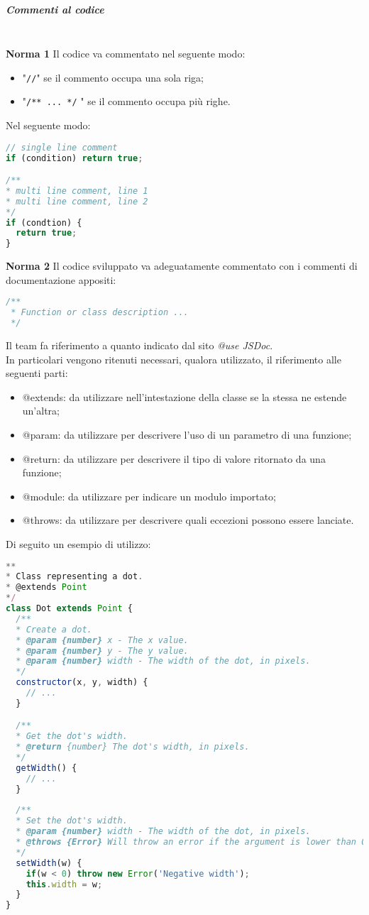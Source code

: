 \subparagraph{Commenti al codice}\-\\
\textbf{Norma 1}
Il codice va commentato nel seguente modo:
\begin{itemize}
	\item "\texttt{//}" se il commento occupa una sola riga;
	\item "\texttt{/** ... */} " se il commento occupa più righe.
\end{itemize}
Nel seguente modo:
\begin{lstlisting}[language=JavaScript]
// single line comment
if (condition) return true;

/**
* multi line comment, line 1
* multi line comment, line 2
*/
if (condtion) {
  return true;
}
\end{lstlisting}
\textbf{Norma 2}\label{Docs_Codice}
Il codice sviluppato va adeguatamente commentato con i commenti di documentazione appositi:
\begin{lstlisting}[language=JavaScript]
/**
 * Function or class description ...
 */
\end{lstlisting}
Il team fa riferimento a quanto indicato dal sito \textit{@use JSDoc}.\\
In particolari vengono ritenuti necessari, qualora utilizzato, il riferimento alle seguenti parti:
\begin{itemize}
	\item @extends: da utilizzare nell'intestazione della classe se la stessa ne estende un'altra;
	\item @param: da utilizzare per descrivere l'uso di un parametro di una funzione;
	\item @return: da utilizzare per descrivere il tipo di valore ritornato da una funzione; 
	\item @module: da utilizzare per indicare un modulo importato;
	\item @throws: da utilizzare per descrivere quali eccezioni possono essere lanciate.
\end{itemize}
Di seguito un esempio di utilizzo:
\begin{lstlisting}[language=JavaScript]
**
* Class representing a dot.
* @extends Point
*/
class Dot extends Point {
  /**
  * Create a dot.
  * @param {number} x - The x value.
  * @param {number} y - The y value.
  * @param {number} width - The width of the dot, in pixels.
  */
  constructor(x, y, width) {
    // ...
  }

  /**
  * Get the dot's width.
  * @return {number} The dot's width, in pixels.
  */
  getWidth() {
    // ...
  }
  
  /**
  * Set the dot's width.
  * @param {number} width - The width of the dot, in pixels.
  * @throws {Error} Will throw an error if the argument is lower than 0.
  */
  setWidth(w) {
    if(w < 0) throw new Error('Negative width');
    this.width = w;
  }
}
\end{lstlisting}

